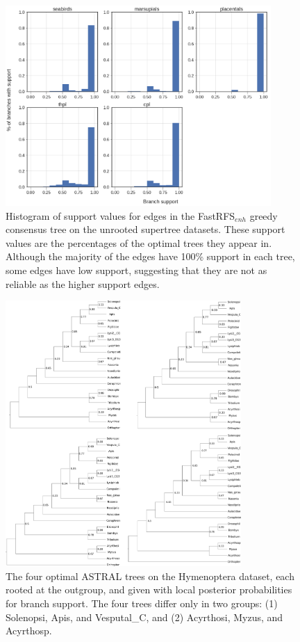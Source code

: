 \begin{figure}[ht]
  \centering
  \includegraphics[width=0.9\textwidth]{siesta-figs/bio_fastrfs_enh_supports.png} 
  \caption[Histogram of support values for edges in the FastRFS$_{enh}$ greedy consensus tree on the unrooted supertree datasets.]{Histogram of support values for edges in the FastRFS$_{enh}$ greedy consensus tree on the unrooted supertree datasets. These support values are
    the percentages of the optimal trees they appear in. 
    Although the majority of the edges have 100\% support in each tree, some edges have low support, suggesting that they are not as reliable as the higher support edges.}
     \label{siesta::fig:support_fastrfs}
\end{figure}
  
  
\begin{figure}[ht]
\includegraphics[width=0.8\textwidth]{siesta-figs/hymenoptera}
\caption[Four optimal ASTRAL trees on biological Hymenoptera dataset]{The four optimal ASTRAL trees on the Hymenoptera dataset, each rooted at the outgroup, and given with local posterior probabilities for branch support. The four trees differ only in two groups: (1) Solenopsi, Apis, and Vesputal\_C, and (2) Acyrthosi, Myzus, and Acyrthosp. }\label{siesta::fig:hymenoptera-optimal}
\end{figure}

